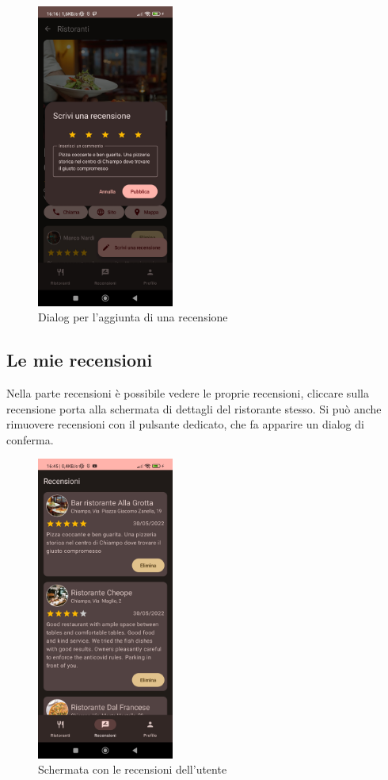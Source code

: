 \documentclass[12pt, a4paper]{report}
\begin{document}
	\begin{figure}[h]
		\centering
		\includegraphics[width=0.4\textwidth]{addReviewDialog.jpg} 
	  \caption{Dialog per l'aggiunta di una recensione}
		
	\end{figure}
	\newpage

	\subsection{Le mie recensioni}
	Nella parte recensioni è possibile vedere le proprie recensioni, cliccare sulla recensione porta alla schermata di dettagli del ristorante stesso.
	Si può anche rimuovere recensioni con il pulsante dedicato, che fa apparire un dialog di conferma.
	


	\begin{figure}
		\centering
		\includegraphics[width=0.4\textwidth]{screenReviews.jpg} 
	  \caption{Schermata con le recensioni dell'utente}
		
	\end{figure}
\end{document}
